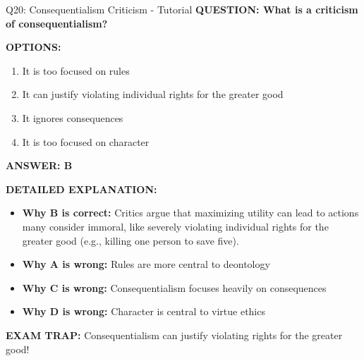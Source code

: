 \documentclass[8pt]{beamer}
\begin{document}
	\begin{frame}{Q20: Consequentialism Criticism - Tutorial}
		\fontsize{6.5}{7.5}\selectfont
		\textbf{QUESTION: What is a criticism of consequentialism?}
		
		\vspace{0.1cm}
		\textbf{OPTIONS:}
		\begin{enumerate}
			\item It is too focused on rules
			\item It can justify violating individual rights for the greater good
			\item It ignores consequences
			\item It is too focused on character
		\end{enumerate}
		
		\vspace{0.1cm}
		\textcolor{myblue}{\textbf{ANSWER: B}}
		
		\vspace{0.1cm}
		\textbf{DETAILED EXPLANATION:}
		\begin{itemize}
			\item \textbf{Why B is correct:} Critics argue that maximizing utility can lead to actions many consider immoral, like severely violating individual rights for the greater good (e.g., killing one person to save five).
			\item \textbf{Why A is wrong:} Rules are more central to deontology
			\item \textbf{Why C is wrong:} Consequentialism focuses heavily on consequences
			\item \textbf{Why D is wrong:} Character is central to virtue ethics
		\end{itemize}
		
		\textcolor{myred}{\textbf{EXAM TRAP:}} Consequentialism can justify \textcolor{myblue}{violating rights for the greater good}!
	\end{frame}
	
\end{document}

